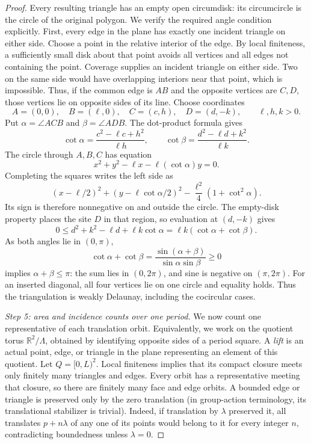 \documentclass[11pt,a4paper]{article}
\theoremstyle{definition}
\theoremstyle{remark}
\newcommand{\R}{\mathbb{R}}
\begin{document}
\begin{proof}
Every resulting triangle has an empty open circumdisk: its circumcircle
is the circle of the original polygon. We verify the required angle
condition explicitly. First, every edge in the plane has exactly one incident triangle on
either side. Choose a point in the relative
interior of the edge. By local finiteness, a sufficiently small disk
about that point avoids all vertices and all edges not containing the
point. Coverage supplies an incident triangle on either side. Two on
the same side would have overlapping interiors near that point, which
is impossible. Thus, if the common edge is $AB$ and the opposite
vertices are $C,D$, those vertices lie on opposite sides of its line.
Choose coordinates
\[
A=(0,0),\quad B=(\ell,0),\quad C=(c,h),\quad D=(d,-k),
\qquad \ell,h,k>0.
\]
Put $\alpha=\angle ACB$ and $\beta=\angle ADB$. The dot-product
formula gives
\[
\cot\alpha=\frac{c^2-\ell c+h^2}{\ell h},
\qquad
\cot\beta=\frac{d^2-\ell d+k^2}{\ell k}.
\]
The circle through $A,B,C$ has equation
\[
x^2+y^2-\ell x-\ell(\cot\alpha)y=0.
\]
Completing the squares writes the left side as
\[
(x-\ell/2)^2+(y-\ell\cot\alpha/2)^2
-\frac{\ell^2}{4}(1+\cot^2\alpha).
\]
Its sign is therefore nonnegative on and outside the circle. The
empty-disk property places the site $D$ in that region, so evaluation
at $(d,-k)$ gives
\[
0\leq d^2+k^2-\ell d+\ell k\cot\alpha
=\ell k(\cot\alpha+\cot\beta).
\]
As both angles lie in $(0,\pi)$,
\[
\cot\alpha+\cot\beta
=\frac{\sin(\alpha+\beta)}{\sin\alpha\sin\beta}\geq0
\]
implies $\alpha+\beta\leq\pi$: the sum lies in $(0,2\pi)$, and
sine is negative on $(\pi,2\pi)$. For an inserted diagonal, all four
vertices lie on one circle and equality holds. Thus the triangulation is
weakly Delaunay, including the cocircular cases.

\smallskip\noindent
\emph{Step 5: area and incidence counts over one period.}
We now count one representative of each translation orbit. Equivalently,
we work on the quotient torus $\R^2/\Lambda$, obtained by identifying
opposite sides of a period square. A \emph{lift} is an actual point, edge,
or triangle in the plane representing an element of this quotient.
Let $Q=[0,L)^2$. Local finiteness implies that its compact closure meets
only finitely many triangles and edges. Every orbit has a representative
meeting that closure, so there are finitely many face and edge orbits.
A bounded edge or triangle is preserved only by the zero translation
(in group-action terminology, its translational stabilizer is trivial).
Indeed, if translation by $\lambda$ preserved it, all translates
$p+n\lambda$ of any one of its points would belong to it for every
integer $n$, contradicting boundedness unless $\lambda=0$.


\end{proof}
\end{document}
